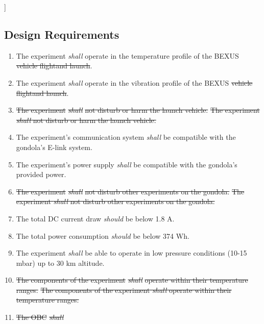]\documentclass[a4paper,12pt,twoside]{article}
\providecommand{\DIFaddtex}[1]{{\protect\color{blue}\uwave{#1}}} %
\providecommand{\DIFdeltex}[1]{{\protect\color{red}\sout{#1}}}                      %
\providecommand{\DIFaddbegin}{} %
\providecommand{\DIFaddend}{} %
\providecommand{\DIFdelbegin}{} %
\providecommand{\DIFdelend}{} %
\providecommand{\DIFadd}[1]{\texorpdfstring{\DIFaddtex{#1}}{#1}} %
\providecommand{\DIFdel}[1]{\texorpdfstring{\DIFdeltex{#1}}{}} %
\newcommand{\DIFscaledelfig}{0.5}
\newlength{\DIFdelgraphicswidth} %
\newlength{\DIFdelgraphicsheight} %
\newcommand{\DIFaddincludegraphics}[2][]{{\color{blue}\fbox{\DIFOincludegraphics[#1]{#2}}}} %
\newcommand{\DIFdelincludegraphics}[2][]{%
\sbox{\DIFdelgraphicsbox}{\DIFOincludegraphics[#1]{#2}}%
\settoboxwidth{\DIFdelgraphicswidth}{\DIFdelgraphicsbox} %
\settoboxtotalheight{\DIFdelgraphicsheight}{\DIFdelgraphicsbox} %
\scalebox{\DIFscaledelfig}{%
\parbox[b]{\DIFdelgraphicswidth}{\usebox{\DIFdelgraphicsbox}\\[-\baselineskip] \rule{\DIFdelgraphicswidth}{0em}}\llap{\resizebox{\DIFdelgraphicswidth}{\DIFdelgraphicsheight}{%
\setlength{\unitlength}{\DIFdelgraphicswidth}%
\begin{picture}(1,1)%
\thicklines\linethickness{2pt} %
{\color[rgb]{1,0,0}\put(0,0){\framebox(1,1){}}}%
{\color[rgb]{1,0,0}\put(0,0){\line( 1,1){1}}}%
{\color[rgb]{1,0,0}\put(0,1){\line(1,-1){1}}}%
\end{picture}%
}\hspace*{3pt}}} %
} %
\DeclareRobustCommand{\DIFaddbegin}{\DIFOaddbegin \let\includegraphics\DIFaddincludegraphics} %
\DeclareRobustCommand{\DIFaddend}{\DIFOaddend \let\includegraphics\DIFOincludegraphics} %
\DeclareRobustCommand{\DIFdelbegin}{\DIFOdelbegin \let\includegraphics\DIFdelincludegraphics} %
\DeclareRobustCommand{\DIFdelend}{\DIFOaddend \let\includegraphics\DIFOincludegraphics} %
\begin{document}
\subsection{Design Requirements}

\begin{enumerate}[label=D.\arabic*]
    \item The experiment \textit{shall} operate in the temperature profile of the BEXUS \DIFdelbegin \DIFdel{vehicle flightand launch}\DIFdelend \DIFaddbegin \DIFadd{flight}\DIFaddend .
    \item The experiment \textit{shall} operate in the vibration profile of the BEXUS \DIFdelbegin \DIFdel{vehicle flightand launch}\DIFdelend \DIFaddbegin \DIFadd{flight}\DIFaddend .
    \item \DIFdelbegin \DIFdel{The experiment }\textit{\DIFdel{shall}} %
\DIFdel{not disturb or harm the launch vehicle.
    }\DIFdelend \DIFaddbegin \st{The experiment \textit{shall} not disturb or harm the launch vehicle.}\DIFadd{\textsuperscript{\ref{fn:unnecessary-requirement}}
    }\DIFaddend \item The experiment's communication system \textit{shall} be compatible with the gondola's E-link system.
    \item The experiment's power supply \textit{shall} be compatible with the gondola's provided power.
    \item \DIFdelbegin \DIFdel{The experiment }\textit{\DIFdel{shall}} %
\DIFdel{not disturb other experiments on the gondola.
    }\DIFdelend \DIFaddbegin \st{The experiment \textit{shall} not disturb other experiments on the gondola.}\DIFadd{\textsuperscript{\ref{fn:unnecessary-requirement}}
    }\DIFaddend \item The total DC current draw \textit{should} be below 1.8 A.
    \item The total power consumption \textit{should} be below 374 Wh.
    \item The experiment \textit{shall} be able to operate in low pressure conditions (10-15 mbar) up to 30 km altitude.
    \item \DIFdelbegin \DIFdel{The components of the experiment }\textit{\DIFdel{shall}} %
\DIFdel{operate within their temperature ranges.
    }\DIFdelend \DIFaddbegin \st{The components of the experiment \textit{shall} operate within their temperature ranges.}\DIFadd{\textsuperscript{\ref{fn:unnecessary-requirement}}
    }\DIFaddend \item \DIFdelbegin \DIFdel{The OBC }\textit{\DIFdel{shall}} %

\end{enumerate}
\end{document}
